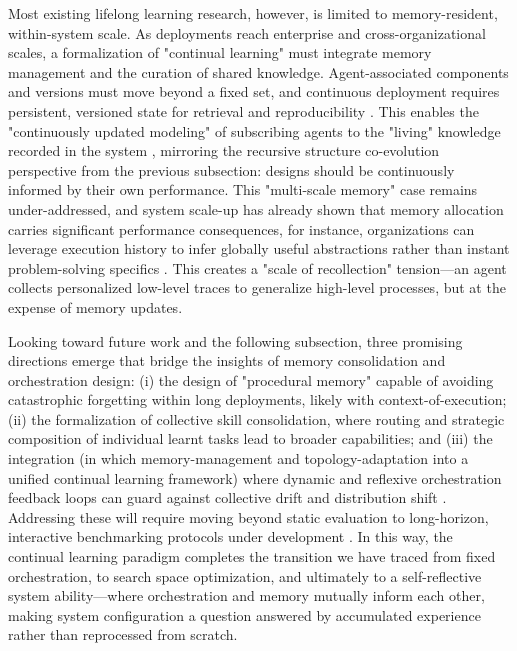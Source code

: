 \documentclass[11pt,a4paper]{article}
\begin{document}
Most existing lifelong learning research, however, is limited to memory-resident, within-system scale. As deployments reach enterprise and cross-organizational scales, a formalization of "continual learning" must integrate memory management and the curation of shared knowledge. Agent-associated components and versions must move beyond a fixed set, and continuous deployment requires persistent, versioned state for retrieval and reproducibility \cite{arxiv:2506.12508v6}. This enables the "continuously updated modeling" of subscribing agents to the "living" knowledge recorded in the system \cite{arxiv:2506.12508v6}, mirroring the recursive structure co-evolution perspective from the previous subsection: designs should be continuously informed by their own performance. This "multi-scale memory" case remains under-addressed, and system scale-up has already shown that memory allocation carries significant performance consequences, for instance, organizations can leverage execution history to infer globally useful abstractions rather than instant problem-solving specifics \cite{arxiv:2410.06153v3}. This creates a "scale of recollection" tension---an agent collects personalized low-level traces to generalize high-level processes, but at the expense of memory updates.

Looking toward future work and the following subsection, three promising directions emerge that bridge the insights of memory consolidation and orchestration design: (i) the design of "procedural memory" capable of avoiding catastrophic forgetting within long deployments, likely with context-of-execution; (ii) the formalization of collective skill consolidation, where routing and strategic composition of individual learnt tasks lead to broader capabilities; and (iii) the integration (in which memory-management and topology-adaptation into a unified continual learning framework) where dynamic and reflexive orchestration feedback loops can guard against collective drift and distribution shift \cite{arxiv:2308.05960v1,arxiv:2412.17481v2}. Addressing these will require moving beyond static evaluation to long-horizon, interactive benchmarking protocols under development \cite{arxiv:1904.08315v1,arxiv:2506.01245v3,arxiv:2506.12508v6}. In this way, the continual learning paradigm completes the transition we have traced from fixed orchestration, to search space optimization, and ultimately to a self-reflective system ability---where orchestration and memory mutually inform each other, making system configuration a question answered by accumulated experience rather than reprocessed from scratch.
\end{document}
